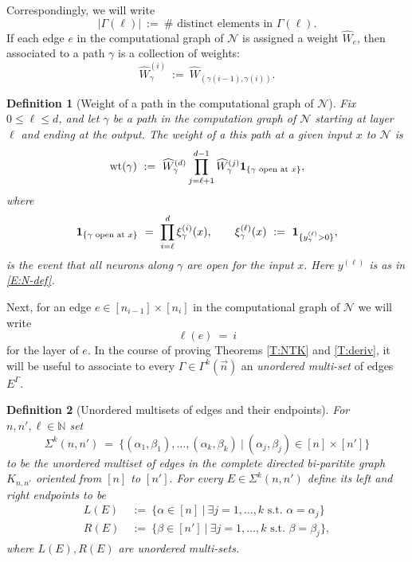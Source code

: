 \documentclass[11pt, reqno]{amsart}
\newtheorem{definition}{Definition}
\newcommand{\N}{{\mathbb N}}
\newcommand{\x}{\ensuremath{\times}}
\newcommand{\abs}[1]{\ensuremath{\left| #1 \right|}}
\newcommand{\lr}[1]{\ensuremath{\left(#1 \right)}}
\newcommand{\set}[1]{\ensuremath{\{#1\}}}
\newcommand{\mN}{\mathcal N}
\DeclareMathOperator{\wt}{wt}
\begin{document}
Correspondingly, we will write
\begin{equation}\label{E:abs-Gamma}
\abs{\Gamma(\ell)}~:=~\# \text{ distinct elements in }\Gamma(\ell).
\end{equation}
If each edge $e$ in the computational graph of $\mN$ is assigned a weight $\widehat{W}_e$, then associated to a path $\gamma$ is a collection of weights:
\begin{equation}\label{E:W-gamma-def}
\widehat{W}_{\gamma}^{(i)}~:=~\widehat{W}_{\lr{\gamma(i-1),\gamma(i)}}.
\end{equation}
\begin{definition}[Weight of a path in the computational graph of $\mN$]
Fix $0\leq \ell\leq d$, and let $\gamma$ be a path in the computation graph of $\mN$ starting at layer $\ell$ and ending at the output. The weight of a this path at a given input $x$ to $\mN$ is
\begin{equation}\label{E:path-weight-def}
    \wt(\gamma)~:=~\widehat{W}_\gamma^{(d)} \prod_{j=\ell+1}^{d-1} \widehat{W}_\gamma^{(j)}{\bf 1}_{\set{\gamma\text{ open at }x}},
\end{equation}
where
\[{\bf 1}_{\set{\gamma\text{ open at }x}} ~=~\prod_{i=\ell}^d \xi_{\gamma}^{(i)}(x),\qquad \xi_{\gamma}^{(\ell)}(x)~:=~{\bf 1}_{\set{y_{\gamma}^{(\ell)}>0}},\]
is the event that all neurons along $\gamma$ are open for the input $x.$ Here $y^{(\ell)}$ is as in \eqref{E:N-def}. 
\end{definition}
\noindent Next, for an edge $e\in [n_{i-1}]\x [n_i]$ in the computational graph of $\mN$ we will write 
\begin{equation}\label{E:edge-def}
\ell(e)~=~i
\end{equation}
for the layer of $e.$ In the course of proving Theorems \ref{T:NTK} and \ref{T:deriv}, it will be useful to associate to every $\Gamma\in \Gamma^k(\vec{n})$ an \textit{unordered multi-set} of edges $E^\Gamma.$
\begin{definition}[Unordered multisets of edges and their endpoints]\label{D:unordered_multisets}
For $n,n',\ell\in \N$ set
\[\Sigma^k(n,n')~=~\set{(\alpha_1,\beta_1),\ldots, (\alpha_k,\beta_k)~|~(\alpha_j,\beta_j)\in [n]\x [n']}\]
to be the \textit{unordered multiset} of edges in the complete directed bi-paritite graph $K_{n,n'}$ oriented from $[n]$ to $[n'].$ For every $E\in \Sigma^k(n,n')$ define its left and right endpoints to be
\begin{align}
L(E)~&:=~\set{\alpha\in [n]~|~\exists j=1,\ldots, k \text{ s.t. } \alpha=\alpha_j}\\
R(E)~&:=~\set{\beta\in [n']~|~\exists j=1,\ldots, k \text{ s.t. } \beta=\beta_j}, 
\end{align}
where $L(E),R(E)$ are \textit{unordered multi-sets}.
\end{definition}
\end{document}
